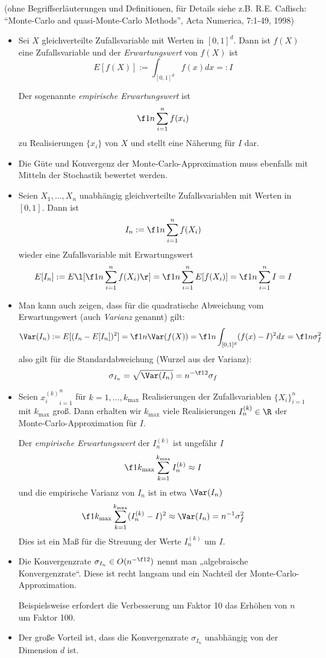 \documentclass[11pt]{scrartcl}
\begin{document}
(ohne Begriffserläuterungen und Definitionen, für Details siehe z.B. R.E. Caflisch: “Monte-Carlo and quasi-Monte-Carlo Methods”, Acta Numerica, 7:1-49, 1998)

\begin{itemize}
	\item
		Sei $X$ gleichverteilte Zufallsvariable mit Werten in $[0,1]^d$.
		Dann ist $f(X)$ eine Zufallsvariable und der \emph{Erwartungswert} von $f(X)$ ist
		\[
			E[f(X)] := \int_{[0,1]^d} f(x) dx =: I
		\]

		Der sogenannte \emph{empirische Erwartungswert} ist
		\[
			\f 1n \sum_{i=1}^n f(x_i)
		\]
		zu Realisierungen $\{x_i\}$ von $X$ und stellt eine Näherung für $I$ dar.
	\item
		Die Güte und Konvergenz der Monte-Carlo-Approximation muss ebenfalls mit Mitteln der Stochastik bewertet werden.
	\item
		Seien $X_1, \dotsc, X_n$ unabhängig gleichverteilte Zufallsvariablen mit Werten in $[0,1]$.
		Dann ist
		\[
			I_n := \f 1n \sum_{i=1}^n f(X_i)
		\]
		wieder eine Zufallsvariable mit Erwartungswert
		\[
			E[I_n] := E\l[\f 1n \sum_{i=1}^n f(X_i)\r] = \f 1n \sum_{i=1}^n E[f(X_i)] = \f 1n \sum_{i=1}^n I = I
		\]
	\item
		Man kann auch zeigen, dass für die quadratische Abweichung vom Erwartungswert (auch \emph{Varianz} genannt) gilt:
		\[
			\Var(I_n) := E[(I_n-E[I_n])^2] = \f 1n \Var(f(X)) = \f 1n \int_{[0,1]^d} (f(x) - I)^2 dx = \f 1n \sigma_f^2
		\]
		also gilt für die Standardabweichung (Wurzel aus der Varianz):
		\[
			\sigma_{I_n} = \sqrt{\Var(I_n)} = n^{-\f 12} \sigma_f
		\]
	\item
		Seien ${x_i^{(k)}}_{i=1}^n$ für $k=1,\dotsc, k_{\text{max}}$ Realisierungen der Zufallsvariablen $\{X_i\}_{i=1}^n$ mit $k_{\text{max}}$ groß.
		Dann erhalten wir $k_{\text{max}}$ viele Realisierungen $I_n^{(k)}\in \R$ der Monte-Carlo-Approximation für $I$.

		Der \emph{empirische Erwartungswert} der $I_n^{(k)}$ ist ungefähr $I$
		\[
			\f 1{k_{\text{max}}} \sum_{k=1}^{k_{\text{max}}} I_n^{(k)} \approx I
		\]
		und die empirische Varianz von $I_n$ ist in etwa $\Var(I_n)$
		\[
			\f 1{k_{\text{max}}} \sum_{k=1}^{k_{\text{max}}}(I_n^{(k)} - I)^2 \approx \Var(I_n) = n^{-1} \sigma_f^2
		\]
		Dies ist ein Maß für die Streuung der Werte $I_n^{(k)}$ um $I$.
	\item
		Die Konvergenzrate $\sigma_{I_n} \in O(n^{-\f 12})$ nennt man „algebraische Konvergenzrate“.
		Diese ist recht langsam und ein Nachteil der Monte-Carlo-Approximation.
		
		Beispielsweise erfordert die Verbesserung um Faktor 10 das Erhöhen von $n$ um Faktor 100.
	\item
		Der große Vorteil ist, dass die Konvergenzrate $\sigma_{I_n}$ unabhängig von der Dimension $d$ ist.
\end{itemize}
\end{document}

